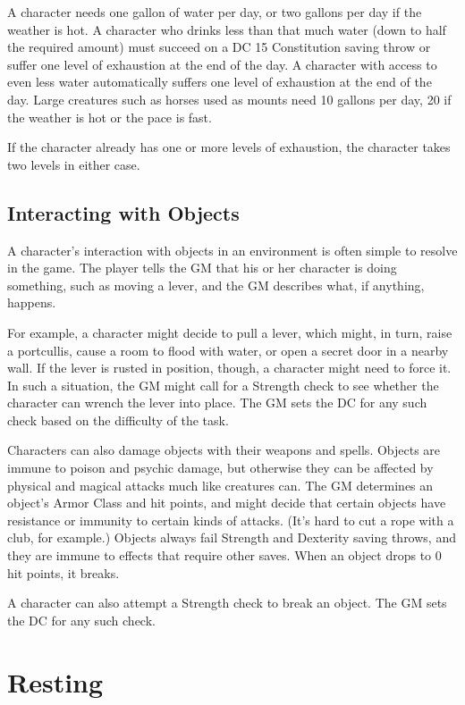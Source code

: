 A character needs one gallon of water per day, or two gallons per day if the weather is hot. A character who drinks less than that much water (down to half the required amount) must succeed on a DC 15 Constitution saving throw or suffer one level of exhaustion at the end of the day. A character with access to even less water automatically suffers one level of exhaustion at the end of the day. Large creatures such as horses used as mounts need 10 gallons per day, 20 if the weather is hot or the pace is fast. 

If the character already has one or more levels of exhaustion, the character takes two levels in either case.

\subsection{Interacting with Objects}

A character's interaction with objects in an environment is often simple to resolve in the game. The player tells the GM that his or her character is doing something, such as moving a lever, and the GM describes what, if anything, happens.

For example, a character might decide to pull a lever, which might, in turn, raise a portcullis, cause a room to flood with water, or open a secret door in a nearby wall. If the lever is rusted in position, though, a character might need to force it. In such a situation, the GM might call for a Strength check to see whether the character can wrench the lever into place. The GM sets the DC for any such check based on the difficulty of the task.

Characters can also damage objects with their weapons and spells. Objects are immune to poison and psychic damage, but otherwise they can be affected by physical and magical attacks much like creatures can. The GM determines an object's Armor Class and hit points, and might decide that certain objects have resistance or immunity to certain kinds of attacks. (It's hard to cut a rope with a club, for example.) Objects always fail Strength and Dexterity saving throws, and they are immune to effects that require other saves. When an object drops to 0 hit points, it breaks.

A character can also attempt a Strength check to break an object. The GM sets the DC for any such check.

\section{Resting}

